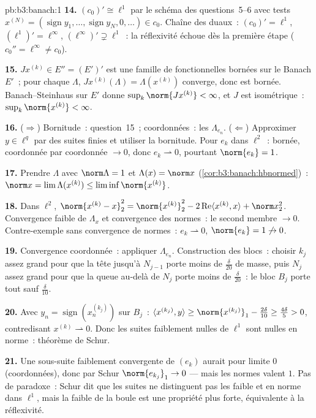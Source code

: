 \begin{solution}{pb:b3:banach:1}
\textbf{14.} $(c_0)' \cong \ell^1$ par le schéma des
questions~5--6 avec tests
$x^{(N)} = (\operatorname{sign}y_1, \dots,
\operatorname{sign}y_N, 0, \dots) \in c_0$. Chaîne des
duaux~: $(c_0)' = \ell^1$, $(\ell^1)' = \ell^\infty$,
$(\ell^\infty)' \supsetneq \ell^1$~: la réflexivité échoue
dès la première étape ($c_0'' = \ell^\infty \neq c_0$).

\textbf{15.} $J x^{(k)} \in E'' = (E')'$ est une famille de
fonctionnelles bornées sur le Banach $E'$~; pour chaque
$\Lambda$, $Jx^{(k)}(\Lambda) = \Lambda(x^{(k)})$ converge,
donc est bornée. Banach--Steinhaus sur $E'$ donne
$\sup_k\norm{Jx^{(k)}} < \infty$, et $J$ est isométrique~:
$\sup_k\norm{x^{(k)}} < \infty$.

\textbf{16.} ($\Rightarrow$) Bornitude~: question~15~;
coordonnées~: les $\Lambda_{e_n}$. ($\Leftarrow$) Approximer
$y \in \ell^q$ par des suites finies et utiliser la
bornitude. Pour $e_k$ dans $\ell^2$~: bornée, coordonnée par
coordonnée $\to 0$, donc $e_k \rightharpoonup 0$, pourtant
$\norm{e_k} = 1$.

\textbf{17.} Prendre $\Lambda$ avec $\norm\Lambda = 1$ et
$\Lambda(x) = \norm x$
(\cref{cor:b3:banach:hbnormed})~: $\norm x =
\lim\Lambda(x^{(k)}) \leq \liminf\norm{x^{(k)}}$.

\textbf{18.} Dans $\ell^2$, $\norm{x^{(k)} - x}_2^2 =
\norm{x^{(k)}}_2^2 - 2\operatorname{Re}\langle x^{(k)},
x\rangle + \norm x_2^2$. Convergence faible de $\Lambda_x$ et
convergence des normes~: le second membre $\to 0$.
Contre-exemple sans convergence de normes~: $e_k
\rightharpoonup 0$, $\norm{e_k} = 1 \not\to 0$.

\textbf{19.} Convergence coordonnée~: appliquer
$\Lambda_{e_n}$. Construction des blocs~: choisir $k_j$ assez
grand pour que la tête jusqu'à $N_{j-1}$ porte moins de
$\frac\delta{20}$ de masse, puis $N_j$ assez grand pour que
la queue au-delà de $N_j$ porte moins de $\frac\delta{20}$~:
le bloc $B_j$ porte tout sauf $\frac\delta{10}$.

\textbf{20.} Avec $y_n = \operatorname{sign}(x^{(k_j)}_n)$ sur
$B_j$~: $\langle x^{(k_j)}, y\rangle \geq
\norm{x^{(k_j)}}_1 - \frac{2\delta}{10} \geq
\frac{4\delta}5 > 0$, contredisant $x^{(k)}
\rightharpoonup 0$. Donc les suites faiblement nulles de
$\ell^1$ sont nulles en norme~: théorème de Schur.

\textbf{21.} Une sous-suite faiblement convergente de $(e_k)$
aurait pour limite $0$ (coordonnées), donc par Schur
$\norm{e_{k_j}}_1 \to 0$ --- mais les normes valent $1$. Pas
de paradoxe~: Schur dit que les suites ne distinguent pas les
 faible et en norme dans $\ell^1$, mais la
 faible de la boule est une propriété
plus forte, équivalente à la réflexivité.


\end{solution}

